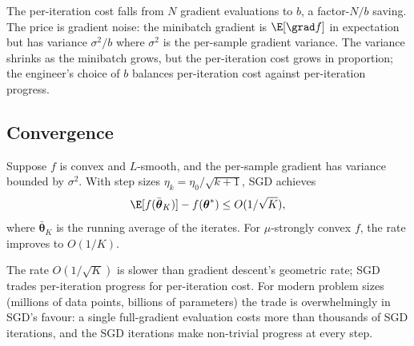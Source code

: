 The per-iteration cost falls from $N$ gradient evaluations to $b$,
a factor-$N/b$ saving. The price is gradient noise: the
minibatch gradient is $\E[\grad f]$ in expectation but has variance
$\sigma^{2}/b$ where $\sigma^{2}$ is the per-sample gradient
variance. The variance shrinks as the minibatch grows, but the
per-iteration cost grows in proportion; the engineer's choice of
$b$ balances per-iteration cost against per-iteration progress.

\subsection{Convergence}

\begin{theorem}
Suppose $f$ is convex and $L$-smooth, and the per-sample gradient
has variance bounded by $\sigma^{2}$. With step sizes $\eta_{k} =
\eta_{0} / \sqrt{k+1}$, SGD achieves
\[
\E[f(\bar{\boldsymbol{\theta}}_{K})] - f(\boldsymbol{\theta}^{*})
\leq O(1/\sqrt{K}),
\]
where $\bar{\boldsymbol{\theta}}_{K}$ is the running average of
the iterates. For $\mu$-strongly convex $f$, the rate improves to
$O(1/K)$.
\end{theorem}

The rate $O(1/\sqrt{K})$ is slower than gradient descent's
geometric rate; SGD trades per-iteration progress for
per-iteration cost. For modern problem sizes (millions of data
points, billions of parameters) the trade is overwhelmingly in
SGD's favour: a single full-gradient evaluation costs more than
thousands of SGD iterations, and the SGD iterations make
non-trivial progress at every step.

